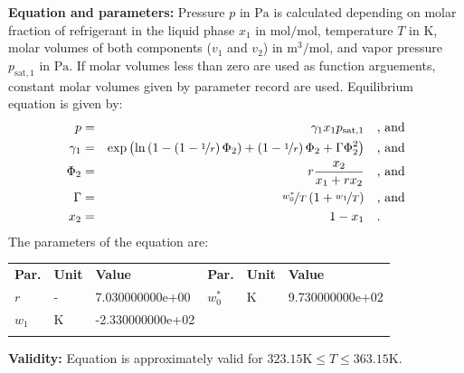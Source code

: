 \textbf{Equation and parameters:}
\newline
%
Pressure $p$ in $\si{\pascal}$ is calculated depending on molar fraction of refrigerant in the liquid phase $x_1$ in $\si{\mole\per\mole}$, temperature $T$ in $\si{\kelvin}$, molar volumes of both components ($v_1$ and $v_2$) in $\si{\cubic\meter\per\mole}$, and vapor pressure $p_\mathrm{sat,1}$ in $\si{\pascal}$. If molar volumes less than zero are used as function arguements, constant molar volumes given by parameter record are used. Equilibrium equation is given by:
%
\begin{equation*}
\begin{split}
p &=& \gamma_1 x_1 p_\mathrm{sat,1} & \quad\text{, and} \\
\gamma_1 &=& \exp \left( \ln \left( 1 - \left( 1 - \nicefrac{1}{r} \right) \Phi_2  \right) + \left(1 - \nicefrac{1}{r}\right) \Phi_2 + \Gamma \Phi_2 ^2 \right) & \quad\text{, and} \\
\Phi_2 &=& r \frac{x_2}{x_1 + r x_2} & \quad\text{, and} \\
\Gamma &=& \nicefrac{w_0^{*}}{T} \left( 1 + \nicefrac{w_1}{T} \right) & \quad\text{, and} \\
x_2 &=& 1 - x_1  & \quad\text{.} \\
\end{split}
\end{equation*}
%
The parameters of the equation are:
%
\begin{longtable}[l]{lll|lll}
\toprule
\addlinespace
\textbf{Par.} & \textbf{Unit} & \textbf{Value} &	\textbf{Par.} & \textbf{Unit} & \textbf{Value} \\
\addlinespace
\midrule
\endhead

\bottomrule
\endfoot
\bottomrule
\endlastfoot
\addlinespace

$r$ & - & 7.030000000e+00 & $w_0^{*}$ & $\si{\kelvin}$ & 9.730000000e+02 \\
$w_1$ & $\si{\kelvin}$ & -2.330000000e+02 & & & \\

\addlinespace\end{longtable}

\textbf{Validity:}
\newline
Equation is approximately valid for $323.15 \si{\kelvin} \leq T \leq 363.15 \si{\kelvin}$.
\newline

